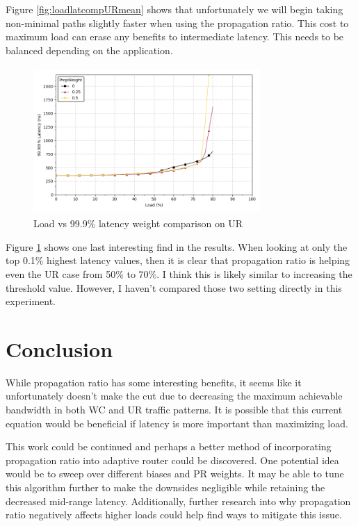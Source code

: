 \documentclass[conference,12pt]{IEEEtran}
\begin{document}
Figure \ref{fig:loadlatcompURmean} shows that unfortunately we will begin taking non-minimal paths slightly faster when using the propagation ratio. This cost to maximum load can erase any benefits to intermediate latency. This needs to be balanced depending on the application. 

\begin{figure}[ht]
  \begin{center}
    \includegraphics[width=3.4in,height=2.2in]{figures/loadlatcomp_UR_99_9.png}
  \end{center}
   \vspace{-0.25in}
 \caption[load latency compare UR 99.9\%]{Load vs 99.9\% latency weight comparison on UR}
 \label{fig:loadlatcompUR99}
\end{figure}

Figure \ref{fig:loadlatcompUR99} shows one last interesting find in the results. When looking at only the top 0.1\% highest latency values, then it is clear that propagation ratio is helping even the UR case from 50\% to 70\%. I think this is likely similar to increasing the threshold value. However, I haven't compared those two setting directly in this experiment.

\section{Conclusion}

While propagation ratio has some interesting benefits, it seems like it unfortunately doesn't make the cut due to decreasing the maximum achievable bandwidth in both WC and UR traffic patterns. It is possible that this current equation would be beneficial if latency is more important than maximizing load.

This work could be continued and perhaps a better method of incorporating propagation ratio into adaptive router could be discovered. One potential idea would be to sweep over different biases and PR weights. It may be able to tune this algorithm further to make the downsides negligible while retaining the decreased mid-range latency. Additionally, further research into why propagation ratio negatively affects higher loads could help find ways to mitigate this issue.

\newpage






\newpage
\end{document}

